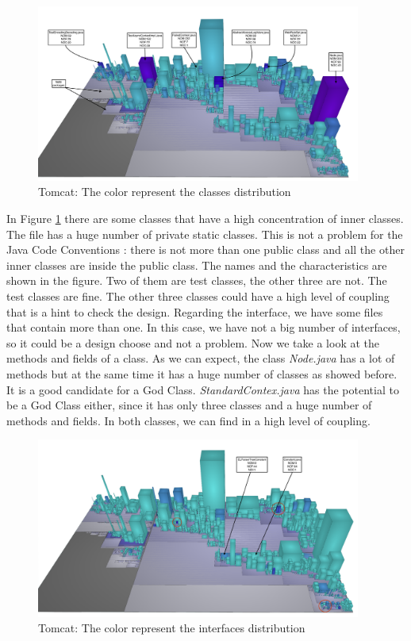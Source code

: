 \documentclass[]{usiinfbachelorproject}
\begin{document}
\begin{figure}[H]
	\centering
	\includegraphics[width=0.95\textwidth]{images/tomcatClss}
	\caption[Tomcat: Classes ]{Tomcat:  The color represent the classes distribution \label{fig:tomcat:a}}
\end{figure}



          

In Figure \ref{fig:tomcat:a} there are some classes that have a high concentration of inner classes. The file has a huge number of private static classes. This is not a problem for the Java Code Conventions \cite{oracle}: there is not more than one public class and all the other inner classes are inside the public class. The names and the characteristics are shown in the figure. Two of them are test classes, the other three are not. The test classes are fine. The other three classes could have a high level of coupling that is a hint to check the design. Regarding the interface, we have some files that contain more than one. In this case, we have not a big number of interfaces, so it could be a design choose and not a problem.
Now we take a look at the methods and fields of a class. As we can expect, the class \textit{Node.java} has a lot of methods but at the same time it has a huge number of classes as showed before. It is a good candidate for a God Class. \textit{StandardContex.java} has the potential to be a God Class either, since it has only three classes and a huge number of methods and fields. In both classes, we can find in a high level of coupling.

\begin{figure}[H]
	\centering
	\includegraphics[width=0.95\textwidth]{images/tomcatInt}
	\caption[Tomcat: Interfaces]{Tomcat:  The color represent the interfaces distribution \label{fig:tomcat:b}}
\end{figure}
\end{document}

